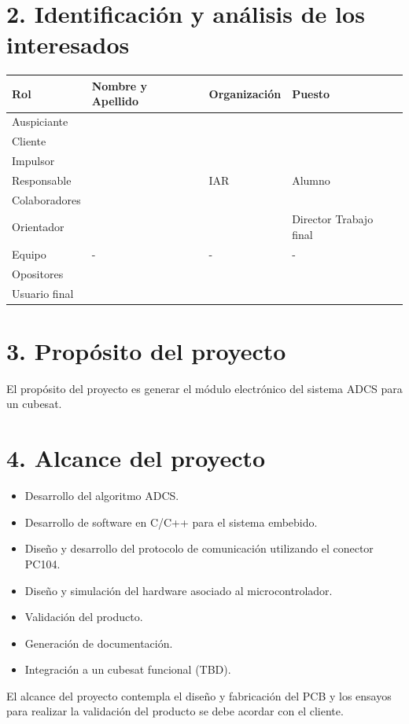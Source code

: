 \documentclass[
11pt, %
]{charter}
\begin{document}
\section{2. Identificación y análisis de los interesados}
\label{sec:interesados}


\begin{table}[ht]
	\begin{tabularx}{\linewidth}{@{}|l|X|X|l|@{}}
		\hline
		\rowcolor[HTML]{C0C0C0} 
		Rol           & Nombre y Apellido & Organización 	& Puesto 	\\ \hline
		Auspiciante   &                   &              	&        	\\ \hline
		Cliente       & \clientename      &\empclientename	&        	\\ \hline
		Impulsor      &                   &              	&        	\\ \hline
		Responsable   & \authorname       & IAR        	& Alumno 	\\ \hline
		Colaboradores &                   &              	&        	\\ \hline
		Orientador    & \supname	      & \pertesupname 	& Director Trabajo final \\ \hline
		Equipo        &  -                &  -             	& -        	\\ \hline
		Opositores    &                   &              	&        	\\ \hline
		Usuario final & \supname     &      \pertesupname        	&        	\\ \hline
	\end{tabularx}
\end{table}


\section{3. Propósito del proyecto}

	El propósito del proyecto es generar el módulo electrónico del sistema ADCS para un cubesat. 

\section{4. Alcance del proyecto}
\label{sec:alcance}
\begin{itemize}
	\item Desarrollo del algoritmo ADCS. 
	\item Desarrollo de software en C/C++ para el sistema embebido. 
	\item Diseño y desarrollo del protocolo de comunicación utilizando el conector PC104.
	\item Diseño y simulación del hardware asociado al microcontrolador. 
	\item Validación del producto.
	\item Generación de documentación.  
	\item Integración a un cubesat funcional (TBD).
\end{itemize}
	El alcance del proyecto contempla el diseño y fabricación del PCB y	los ensayos para realizar la validación del producto se debe acordar con el cliente.  
	
\end{document}
